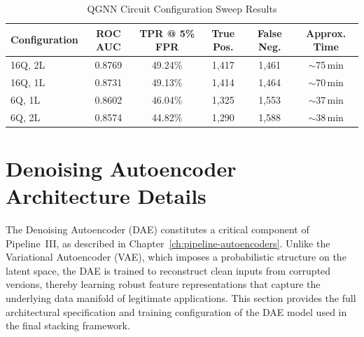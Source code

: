 \begin{table}[H]
\centering
\caption{QGNN Circuit Configuration Sweep Results}
\label{tab:app-qgnn-sweep}
\small
\begin{tabular}{lccccc}
\toprule
\textbf{Configuration} & \textbf{ROC AUC} & \textbf{TPR @ 5\% FPR} & \textbf{True Pos.} & \textbf{False Neg.} & \textbf{Approx. Time} \\
\midrule
16Q, 2L & 0.8769 & 49.24\% & 1,417 & 1,461 & $\sim$75\,min \\
16Q, 1L & 0.8731 & 49.13\% & 1,414 & 1,464 & $\sim$70\,min \\
6Q, 1L  & 0.8602 & 46.04\% & 1,325 & 1,553 & $\sim$37\,min \\
6Q, 2L  & 0.8574 & 44.82\% & 1,290 & 1,588 & $\sim$38\,min \\
\bottomrule
\end{tabular}
\end{table}

\section{Denoising Autoencoder Architecture Details}
\label{app:dae-architecture}

The Denoising Autoencoder (DAE) constitutes a critical component of Pipeline~III, as described in Chapter~\ref{ch:pipeline-autoencoders}. Unlike the Variational Autoencoder (VAE), which imposes a probabilistic structure on the latent space, the DAE is trained to reconstruct clean inputs from corrupted versions, thereby learning robust feature representations that capture the underlying data manifold of legitimate applications. This section provides the full architectural specification and training configuration of the DAE model used in the final stacking framework.

